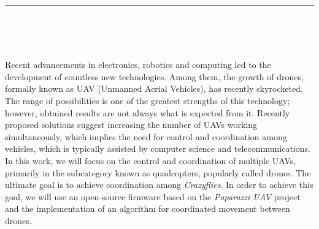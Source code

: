 
\chapter*{}

\thispagestyle{empty}


\begin{center}
    {\Large\bfseries \myTitleEnglish} \\[2mm]
    \myName \\
\end{center}

\noindent\rule[-1ex]{\textwidth}{1pt}\\[3ex]

 \\

\vspace{3mm}

 \\

Recent advancements in electronics, robotics and computing led to the development of countless new technologies. Among them, the
growth of drones, formally known as UAV (Unmanned Aerial Vehicles), has recently skyrocketed. \\

The range of possibilities is one of the greatest strengths of this technology; however, obtained results are not always what is expected from it. 
Recently proposed solutions suggest increasing the number of UAVs working simultaneously, 
which implies the need for control and coordination among vehicles, which is typically assisted by computer science and telecommunications. \\

In this work, we will focus on the control and coordination of multiple UAVs, primarily in the subcategory known as quadcopters, popularly called drones.  
The ultimate goal is to achieve coordination among \textit{Crazyflies}.
In order to achieve this goal, we will use an open-source firmware based on the \textit{Paparazzi UAV} project and the implementation of an algorithm for coordinated movement between drones.

